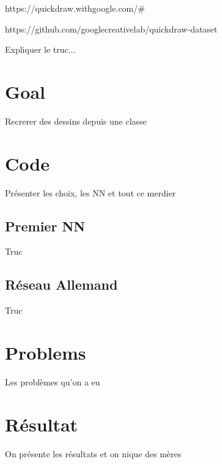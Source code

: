 \documentclass[
  10pt, 
  a4paper,
  oneside, 
  headinclude, 
  footinclude, 
  BCOR5mm, 
]{scrartcl}
\begin{document}
https://quickdraw.withgoogle.com/\#

https://github.com/googlecreativelab/quickdraw-dataset

Expliquer le truc...


\section{Goal}

Recrerer des dessins depuis une classe


\section{Code}

Présenter les choix, les NN et tout ce merdier

\subsection{Premier NN}

Truc

\subsection{Réseau Allemand}

Truc


\section{Problems}

Les problèmes qu'on a eu


\section{Résultat}

On présente les résultats et on nique des mères


\newpage

\tableofcontents
\listoffigures
\listoftables

\begin{thebibliography}{9}
\end{thebibliography}
\end{document}
